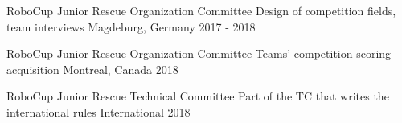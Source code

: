 
\begin{cvhonors}

  \cvhonor
    {RoboCup Junior Rescue Organization Committee} %
    {Design of competition fields, team interviews} %
    {Magdeburg, Germany} %
    {2017 - 2018} %
    
  \cvhonor
    {RoboCup Junior Rescue Organization Committee} %
    {Teams' competition scoring acquisition} %
    {Montreal, Canada} %
    {2018} %

  \cvhonor
    {RoboCup Junior Rescue Technical Committee} %
    {Part of the TC that writes the international rules} %
    {International} %
    {2018} %


\end{cvhonors}

